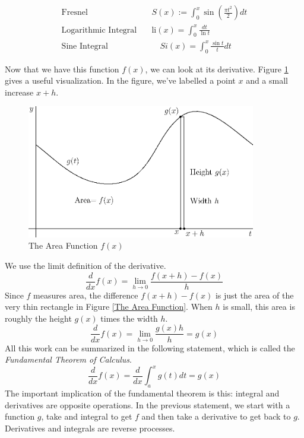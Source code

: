 \documentclass[fleqn]{report}
\begin{document}
\begin{example}
\begin{align*}
\text{Fresnel} \quad & S(x) := \int_0^x \sin \left(\frac{\pi t^2}{2}
\right) dt \\
\text{Logarithmic Integral} \quad & \text{li}(x) = \int_0^x
\frac{dt}{\ln t} \\
\text{Sine Integral} & \quad Si(x) = \int_0^x \frac{\sin t}{t} dt
\end{align*}
\end{example}

Now that we have this function $f(x)$, we can look at its
derivative. Figure \ref{The Area Function} gives a useful
visualization. In the figure,  we've labelled a
point $x$ and a small increase $x+h$.

\begin{figure}[ht]
\centering
\includegraphics[width=10cm]{figure53.eps}
\caption{The Area Function $f(x)$}
\label{The Area Function}
\end{figure}

We use the limit definition of the derivative.
\begin{equation*}
\frac{d}{dx} f(x) = \lim_{h \rightarrow 0} \frac{f(x+h) - f(x)}{h}
\end{equation*}
Since $f$ measures area, the difference $f(x+h) - f(x)$ is just
the area of the very thin rectangle in Figure \ref{The Area
Function}.  When $h$ is small, this area is roughly the height
$g(x)$ times the width $h$. 
\begin{equation*}
\frac{d}{dx} f(x) = \lim_{h \rightarrow 0} \frac{g(x) h}{h} =
g(x)
\end{equation*}
All this work can be summarized in the following statement,
which is called the \emph{Fundamental Theorem of Calculus}.
\begin{equation*}
\frac{d}{dx} f(x) = \frac{d}{dx} \int_a^x g(t) dt = g(x) 
\end{equation*}
The important implication of the fundamental theorem is this:
integral and derivatives are opposite operations. In the
previous statement, we start with a function $g$, take and
integral to get $f$ and then take a derivative to get back to
$g$. Derivatives and integrals are reverse
processes.
\end{document}

